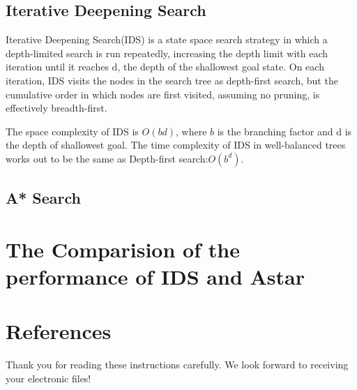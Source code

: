 \documentclass[letterpaper]{article}
\begin{document}
\subsection{Iterative Deepening Search}
Iterative Deepening Search(IDS) is a state space search strategy in which a depth-limited search is run repeatedly, increasing the depth limit with each iteration until it reaches d, the depth of the shallowest goal state. On each iteration, IDS visits the nodes in the search tree as depth-first search, but the cumulative order in which nodes are first visited, assuming no pruning, is effectively breadth-first.

The space complexity of IDS is $O(bd)$, where $b$ is the branching factor and d is the depth of shallowest goal. The time complexity of IDS in well-balanced trees works out to be the same as Depth-first search:$O(b^{d})$.
\subsection{A* Search}
\section{The Comparision of the performance of IDS and Astar}
\section{ References}

\bigskip
\noindent Thank you for reading these instructions carefully. We look forward to receiving your electronic files!
\end{document}

